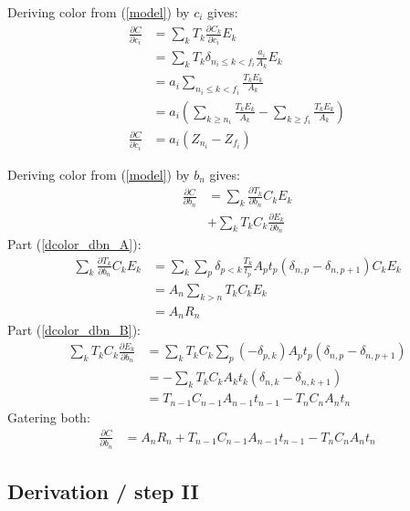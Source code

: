 \documentclass{article}
\begin{document}
\begin{appendices}
    Deriving color from (\ref{model}) by $c_i$ gives:
    \begin{align}
        \frac{\partial C}{\partial c_i} & = \sum_{k} T_k \frac{\partial C_k}{\partial c_i} E_k \nonumber \\
        & = \sum_{k} T_k \delta_{n_i \leq k < f_i} \frac{a_i}{A_k} E_k \nonumber \\
        & = a_i \sum_{n_i \leq k < f_i} \frac{T_k E_k}{A_k} \nonumber \\
        & = a_i (\sum_{k \geq n_i} \frac{T_k E_k}{A_k} - \sum_{k \geq f_i} \frac{T_k E_k}{A_k}) \nonumber \\
        \frac{\partial C}{\partial c_i} & = a_i (Z_{n_i} - Z_{f_i}) \label{dcolor_dci}
    \end{align}

    Deriving color from (\ref{model}) by $b_n$ gives:
    \begin{align}
        \frac{\partial C}{\partial b_n} & = \sum_{k} \frac{\partial T_k}{\partial b_n} C_k E_k \label{dcolor_dbn_A} \\
                                        & + \sum_{k} T_k C_k \frac{\partial E_k}{\partial b_n} \label{dcolor_dbn_B}
    \end{align}
    Part (\ref{dcolor_dbn_A}):
    \begin{align}
        \sum_{k} \frac{\partial T_k}{\partial b_n} C_k E_k & = \sum_{k} \sum_{p} \delta_{p<k} \frac{T_k}{t_p} A_p t_p (\delta_{n,p} - \delta_{n,p+1}) C_k E_k \nonumber \\
        & = A_{n} \sum_{k > n} T_k C_k E_k \nonumber \\
        & = A_{n} R_n \nonumber
    \end{align}
    Part (\ref{dcolor_dbn_B}):
    \begin{align}
        \sum_{k} T_k C_k \frac{\partial E_k}{\partial b_n} & = \sum_{k} T_k C_k \sum_{p} (- \delta_{p,k}) A_p t_p (\delta_{n,p} - \delta_{n,p+1}) \nonumber \\
        & = - \sum_{k} T_k C_k A_k t_k (\delta_{n,k} - \delta_{n,k+1}) \nonumber \\
        & = T_{n-1} C_{n-1} A_{n-1} t_{n-1} - T_n C_n A_n t_n \nonumber
    \end{align}
    Gatering both:
    \begin{align}
        \frac{\partial C}{\partial b_n} & = A_{n} R_n + T_{n-1} C_{n-1} A_{n-1} t_{n-1} - T_n C_n A_n t_n \label{dcolor_dbn}
    \end{align}

    \subsection{Derivation / step II}


\end{appendices}
\end{document}
